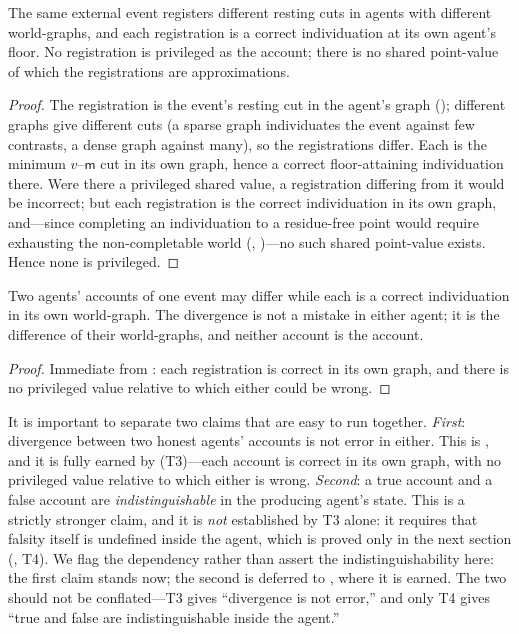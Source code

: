 \documentclass[11pt,twocolumn,a4paper]{article}
\newcommand{\med}{\mathsf{m}}
\begin{document}
\begin{theorem}
\label{thm:receiverrel}
The same external event registers different resting cuts in agents with
different world-graphs, and each registration is a correct individuation at
its own agent's floor. No registration is privileged as the account; there
is no shared point-value of which the registrations are approximations.
\end{theorem}

\begin{proof}
The registration is the event's resting cut in the agent's graph
(); different graphs give different cuts (a sparse
graph individuates the event against few contrasts, a dense graph against
many), so the registrations differ. Each is the minimum $v$--$\med$ cut in
its own graph, hence a correct floor-attaining individuation there. Were
there a privileged shared value, a registration differing from it would be
incorrect; but each registration is the correct individuation in its own
graph, and---since completing an individuation to a residue-free point would
require exhausting the non-completable world
(, )---no such shared
point-value exists. Hence none is privileged.
\end{proof}

\begin{corollary}
\label{cor:divergence}
Two agents' accounts of one event may differ while each is a correct
individuation in its own world-graph. The divergence is not a mistake in
either agent; it is the difference of their world-graphs, and neither
account is the account.
\end{corollary}

\begin{proof}
Immediate from : each registration is correct in its
own graph, and there is no privileged value relative to which either could
be wrong.
\end{proof}

\begin{remark}
\label{rem:honestdiv}
It is important to separate two claims that are easy to run together.
\emph{First}: divergence between two honest agents' accounts is not error in
either. This is , and it is fully earned by
 (T3)---each account is correct in its own graph, with
no privileged value relative to which either is wrong. \emph{Second}: a true
account and a false account are \emph{indistinguishable} in the producing
agent's state. This is a strictly stronger claim, and it is \emph{not}
established by T3 alone: it requires that falsity itself is undefined inside
the agent, which is proved only in the next section
(, T4). We flag the dependency rather than assert
the indistinguishability here: the first claim stands now; the second is
deferred to , where it is earned. The two should not be
conflated---T3 gives ``divergence is not error,'' and only T4 gives ``true
and false are indistinguishable inside the agent.''
\end{remark}
\end{document}
